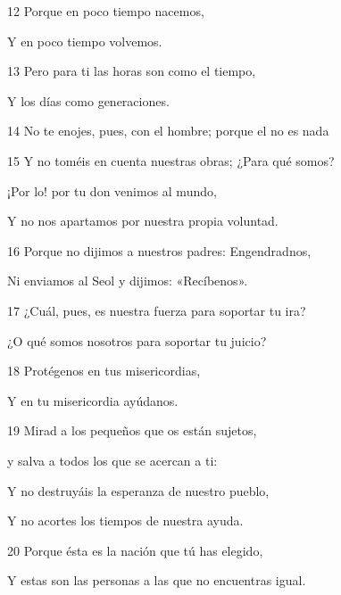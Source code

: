 \par 12 Porque en poco tiempo nacemos,

\par Y en poco tiempo volvemos.

\par 13 Pero para ti las horas son como el tiempo,

\par Y los días como generaciones.

\par 14 No te enojes, pues, con el hombre; porque el no es nada

\par 15 Y no toméis en cuenta nuestras obras; ¿Para qué somos?

\par ¡Por lo! por tu don venimos al mundo,

\par Y no nos apartamos por nuestra propia voluntad.

\par 16 Porque no dijimos a nuestros padres: Engendradnos,

\par Ni enviamos al Seol y dijimos: «Recíbenos».

\par 17 ¿Cuál, pues, es nuestra fuerza para soportar tu ira?

\par ¿O qué somos nosotros para soportar tu juicio?

\par 18 Protégenos en tus misericordias,

\par Y en tu misericordia ayúdanos.

\par 19 Mirad a los pequeños que os están sujetos,

\par y salva a todos los que se acercan a ti:

\par Y no destruyáis la esperanza de nuestro pueblo,

\par Y no acortes los tiempos de nuestra ayuda.

\par 20 Porque ésta es la nación que tú has elegido,

\par Y estas son las personas a las que no encuentras igual.

